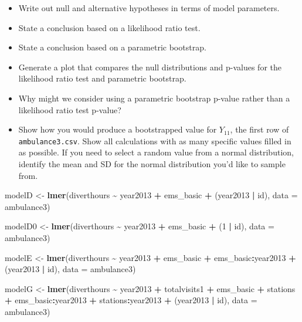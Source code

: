 \documentclass[
]{krantz}
\newenvironment{Shaded}{\begin{snugshade}}{\end{snugshade}}
\newcommand{\AttributeTok}[1]{\textcolor[rgb]{0.27,0.27,0.27}{#1}}
\newcommand{\DecValTok}[1]{\textcolor[rgb]{0.06,0.06,0.06}{#1}}
\newcommand{\FunctionTok}[1]{\textcolor[rgb]{0.27,0.27,0.27}{\textbf{#1}}}
\newcommand{\NormalTok}[1]{#1}
\newcommand{\OtherTok}[1]{\textcolor[rgb]{0.37,0.37,0.37}{#1}}
\newcommand{\SpecialCharTok}[1]{\textcolor[rgb]{0.43,0.43,0.43}{\textbf{#1}}}
\providecommand{\tightlist}{%
  \setlength{\itemsep}{0pt}\setlength{\parskip}{0pt}}
\begin{document}
\begin{enumerate}
  \begin{itemize}
  \tightlist
  \item
    Write out null and alternative hypotheses in terms of model parameters.
  \item
    State a conclusion based on a likelihood ratio test.
  \item
    State a conclusion based on a parametric bootstrap.
  \item
    Generate a plot that compares the null distributions and p-values for the likelihood ratio test and parametric bootstrap.
  \item
    Why might we consider using a parametric bootstrap p-value rather than a likelihood ratio test p-value?
  \item
    Show how you would produce a bootstrapped value for \(Y_{11}\), the first row of \texttt{ambulance3.csv}. Show all calculations with as many specific values filled in as possible. If you need to select a random value from a normal distribution, identify the mean and SD for the normal distribution you'd like to sample from.
  \end{itemize}
\end{enumerate}

\begin{Shaded}
\begin{Highlighting}[]
\NormalTok{modelD }\OtherTok{\textless{}{-}} \FunctionTok{lmer}\NormalTok{(diverthours }\SpecialCharTok{\textasciitilde{}}\NormalTok{ year2013 }\SpecialCharTok{+}\NormalTok{ ems\_basic }\SpecialCharTok{+} 
\NormalTok{  (year2013 }\SpecialCharTok{|}\NormalTok{ id), }\AttributeTok{data =}\NormalTok{ ambulance3)}

\NormalTok{modelD0 }\OtherTok{\textless{}{-}} \FunctionTok{lmer}\NormalTok{(diverthours }\SpecialCharTok{\textasciitilde{}}\NormalTok{ year2013 }\SpecialCharTok{+}\NormalTok{ ems\_basic }\SpecialCharTok{+} 
\NormalTok{  (}\DecValTok{1} \SpecialCharTok{|}\NormalTok{ id), }\AttributeTok{data =}\NormalTok{ ambulance3)}

\NormalTok{modelE }\OtherTok{\textless{}{-}} \FunctionTok{lmer}\NormalTok{(diverthours }\SpecialCharTok{\textasciitilde{}}\NormalTok{ year2013 }\SpecialCharTok{+}\NormalTok{ ems\_basic }\SpecialCharTok{+}
\NormalTok{  ems\_basic}\SpecialCharTok{:}\NormalTok{year2013 }\SpecialCharTok{+}\NormalTok{ (year2013 }\SpecialCharTok{|}\NormalTok{ id), }\AttributeTok{data =}\NormalTok{ ambulance3)}

\NormalTok{modelG }\OtherTok{\textless{}{-}} \FunctionTok{lmer}\NormalTok{(diverthours }\SpecialCharTok{\textasciitilde{}}\NormalTok{ year2013 }\SpecialCharTok{+}\NormalTok{ totalvisits1 }\SpecialCharTok{+} 
\NormalTok{  ems\_basic }\SpecialCharTok{+}\NormalTok{ stations }\SpecialCharTok{+}\NormalTok{ ems\_basic}\SpecialCharTok{:}\NormalTok{year2013 }\SpecialCharTok{+} 
\NormalTok{  stations}\SpecialCharTok{:}\NormalTok{year2013 }\SpecialCharTok{+}\NormalTok{ (year2013 }\SpecialCharTok{|}\NormalTok{ id), }\AttributeTok{data =}\NormalTok{ ambulance3)}
\end{Highlighting}
\end{Shaded}
\end{document}
